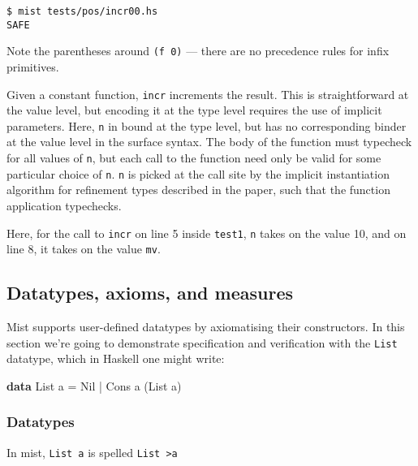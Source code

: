\documentclass[
]{darts-v2021}
\newenvironment{Shaded}{}{}
\newcommand{\DataTypeTok}[1]{\textcolor[rgb]{0.56,0.13,0.00}{#1}}
\newcommand{\KeywordTok}[1]{\textcolor[rgb]{0.00,0.44,0.13}{\textbf{#1}}}
\newcommand{\NormalTok}[1]{#1}
\newcommand{\OperatorTok}[1]{\textcolor[rgb]{0.40,0.40,0.40}{#1}}
\newcommand{\OtherTok}[1]{\textcolor[rgb]{0.00,0.44,0.13}{#1}}
\renewenvironment{quote}{\begin{myquote}}{\end{myquote}}
\begin{document}
\begin{verbatim}
$ mist tests/pos/incr00.hs
SAFE
\end{verbatim}

\begin{quote}
Note the parentheses around \texttt{(f\ 0)} --- there are no precedence
rules for infix primitives.
\end{quote}

Given a constant function, \texttt{incr} increments the result. This is
straightforward at the value level, but encoding it at the type level
requires the use of implicit parameters. Here, \texttt{n} in bound at
the type level, but has no corresponding binder at the value level in
the surface syntax. The body of the function must typecheck for all
values of \texttt{n}, but each call to the function need only be valid
for some particular choice of \texttt{n}. \texttt{n} is picked at the
call site by the implicit instantiation algorithm for refinement types
described in the paper, such that the function application typechecks.

Here, for the call to \texttt{incr} on line 5 inside \texttt{test1},
\texttt{n} takes on the value 10, and on line 8, it takes on the value
\texttt{mv}.

\hypertarget{datatypes-axioms-and-measures}{%
\subsection{Datatypes, axioms, and
measures}\label{datatypes-axioms-and-measures}}

Mist supports user-defined datatypes by axiomatising their constructors.
In this section we're going to demonstrate specification and
verification with the \texttt{List} datatype, which in Haskell one might
write:

\begin{Shaded}
\begin{Highlighting}[]
\KeywordTok{data} \DataTypeTok{List}\NormalTok{ a }\OtherTok{=} \DataTypeTok{Nil} \OperatorTok{|} \DataTypeTok{Cons}\NormalTok{ a (}\DataTypeTok{List}\NormalTok{ a)}
\end{Highlighting}
\end{Shaded}

\hypertarget{datatypes}{%
\subsubsection{Datatypes}\label{datatypes}}

In mist, \texttt{List\ a} is spelled \texttt{List\ \textgreater{}a}
\end{document}
